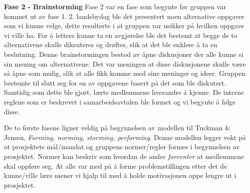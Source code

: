 \begin{adjustwidth}{2.5cm}{0cm}
\begin{figure}
\end{figure}

\noindent \textbf{\Large Fase 2 - Brainstorming}
Fase 2 var en fase som begynte før gruppen var kommet ut av fase 1. 
2. landsbydag ble det presentert noen alternative oppgaver som vi kunne velge, dette resulterte i at gruppen var usikker på hvilken oppgave vi ville ha. 
For å lettere kunne ta en avgjørelse ble det bestemt at begge de to alternativene skulle diksuteres og drøftes, slik at det ble enklere å ta en beslutning. 
Denne brainstormingen bestod av åpne diskusjoner der alle kunne si sin mening om alternativene. 
Det var meningen at disse diskusjonene skulle være så åpne som mulig, slik at alle fikk komme med sine meninger og ideer. 
Gruppen bestemte til slutt seg for en av oppgavene basert på det som ble diskutert. 
Samtidig som dette ble gjort, lærte medlemmene hverandre å kjenne. 
De interne reglene som er beskrevet i samarbeidsavtalen ble formet og vi begynte å følge disse. 

De to første fasene ligner veldig på begynnelsen av modellen til Tuckman \& Jensen, \textit{Forming, norming, storming, performing}. 
Denne modellen legger vekt på at prosjektets mål/mandat og gruppens normer/regler formes i begynnelsen av prosjektet. 
Normer kan beskriv som hvordan de andre \textit{forventer} at medlemmene skal oppføre seg\citep{schwarz}. 
At alle var med på å forme problemstillingen etter det de kunne/ville lære mener vi hjalp til med å holde motivasjonen oppe lengre ut i prosjektet. 
\vspace{\secspace}


\end{adjustwidth}
